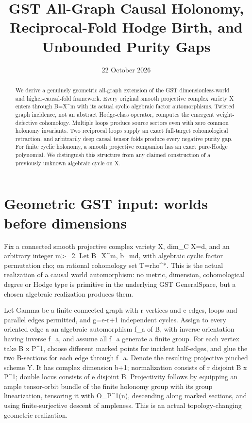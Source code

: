 \documentclass[11pt]{article}
\title{GST All-Graph Causal Holonomy, Reciprocal-Fold Hodge Birth, and Unbounded Purity Gaps}
\date{22 October 2026}
\begin{document}
\maketitle
\begin{abstract}
We derive a genuinely geometric all-graph extension of the GST dimensionless-world and higher-causal-fold framework. Every original smooth projective complex variety X enters through B=X^m with its actual cyclic algebraic factor automorphisms. Twisted graph incidence, not an abstract Hodge-class operator, computes the emergent weight-defective cohomology. Multiple loops produce source sectors even with zero common holonomy invariants. Two reciprocal loops supply an exact full-target cohomological retraction, and arbitrarily deep causal tensor folds produce every negative purity gap. For finite cyclic holonomy, a smooth projective companion has an exact pure-Hodge polynomial. We distinguish this structure from any claimed construction of a previously unknown algebraic cycle on X.
\end{abstract}

\section{Geometric GST input: worlds before dimensions}
Fix a connected smooth projective complex variety X, dim_C X=d, and an arbitrary integer m>=2. Let B=X^m, b=md, with algebraic cyclic factor permutation rho; on rational cohomology set T=rho^*. This is the actual realization of a causal world automorphism: no metric, dimension, cohomological degree or Hodge type is primitive in the underlying GST GeneralSpace, but a chosen algebraic realization produces them.

Let Gamma be a finite connected graph with r vertices and e edges, loops and parallel edges permitted, and g=e-r+1 independent cycles. Assign to every oriented edge a an algebraic automorphism f_a of B, with inverse orientation having inverse f_a, and assume all f_a generate a finite group. For each vertex take B x P^1, choose different marked points for incident half-edges, and glue the two B-sections for each edge through f_a. Denote the resulting projective pinched scheme Y. It has complex dimension b+1; normalization consists of r disjoint B x P^1; double locus consists of e disjoint B. Projectivity follows by equipping an ample tensor-orbit bundle of the finite holonomy group with its group linearization, tensoring it with O_{P^1}(n), descending along marked sections, and using finite-surjective descent of ampleness. This is an actual topology-changing geometric realization.
\end{document}

